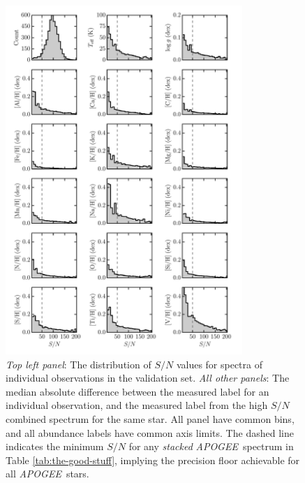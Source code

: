 \documentclass[12pt,preprint]{aastex}
\newcommand{\project}[1]{\textsl{#1}}
\newcommand{\acronym}[1]{{\small{#1}}}
\newcommand{\apogee}{\project{\acronym{APOGEE}}}
\begin{document}
\clearpage

\begin{figure}[p]
\centering
\includegraphics[width=0.8\textwidth]{validation-label-recovery.pdf}
\caption{\emph{Top left panel}: The distribution of $S/N$ values for spectra of individual observations in the validation set. \emph{All other panels}: The median absolute difference between the measured label for an individual observation, and the measured label from the high $S/N$ combined spectrum for the same star.  All panel have common bins, and all abundance labels have common axis limits.  The dashed line indicates the minimum $S/N$ for any \emph{stacked} \apogee\ spectrum in Table \ref{tab:the-good-stuff}, implying the precision floor achievable for all \apogee\ stars.\label{fig:label-recovery-snr}}
\end{figure}

\clearpage
\end{document}
